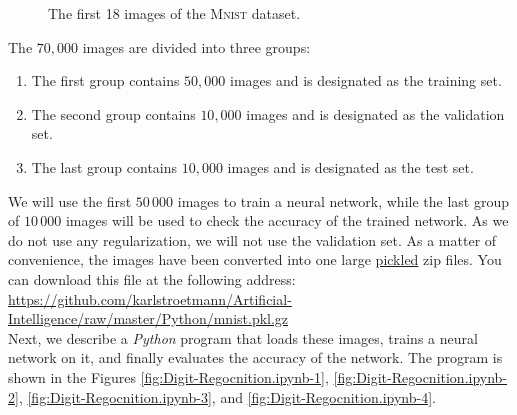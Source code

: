 \begin{figure}[h]
  \begin{center}
  \end{center}
  \caption{The first 18 images of the \textsc{Mnist} dataset.}
  \label{fig:mnist_imgs}
\end{figure}
The $70,000$ images are divided into three groups:
\begin{enumerate}
\item The first group contains $50,000$ images and is designated as the training set.
\item The second group contains $10,000$ images and is designated as the validation set.
\item The last group contains $10,000$ images and is designated as the test set.
\end{enumerate}
We will use the first $50\,000$ images to train a neural network, while the last group of $10\,000$ images
will be used to check the accuracy of the trained network.  As we do not use any regularization, we will not
use the validation set.
As a matter of convenience, the images have been
converted into one large \href{https://docs.python.org/3.7/library/pickle.html}{pickled}  zip
files.  You can download this file at the following address: 
\\[0.2cm]
\hspace*{1.0cm}
\href{https://github.com/karlstroetmann/Artificial-Intelligence/raw/master/Python/mnist.pkl.gz}{https://github.com/karlstroetmann/Artificial-Intelligence/raw/master/Python/mnist.pkl.gz}
\\[0.2cm]
Next, we describe a \textsl{Python} program that loads these images, trains a neural network on it, and
finally evaluates the accuracy of the network.  The program is shown in the Figures
\ref{fig:Digit-Regocnition.ipynb-1}, \ref{fig:Digit-Regocnition.ipynb-2}, \ref{fig:Digit-Regocnition.ipynb-3},
and \ref{fig:Digit-Regocnition.ipynb-4}.


